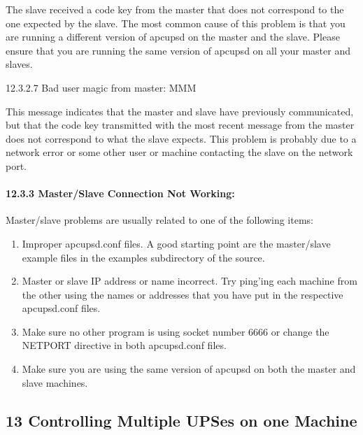 The slave received a code key from the master that does not correspond to the
one expected by the slave. The most common cause of this problem is that you
are running a different version of apcupsd on the master and the slave. Please
ensure that you are running the same version of apcupsd on all your master and
slaves. 

\label{Bad-user-magic-from-master_003b-MMM}

{\small12.3.2.7 Bad user magic from master: MMM}

This message indicates that the master and slave have previously communicated,
but that the code key transmitted with the most recent message from the master
does not correspond to what the slave expects. This problem is probably due to
a network error or some other user or machine contacting the slave on the
network port. 

\label{Master_002fSlave-Connection-Not-Working}

\paragraph*{12.3.3 Master/Slave Connection Not Working:}

Master/slave problems are usually related to one of the following items:  

\begin{enumerate}
\item Improper apcupsd.conf files. A good starting point are the master/slave
example files in the examples subdirectory of the source.  
\item Master or slave IP address or name incorrect. Try ping'ing each machine
from the other using the names or addresses that you have put in the
respective apcupsd.conf files.  
\item Make sure no other program is using socket number 6666 or change the
NETPORT directive in both apcupsd.conf files.  
\item Make sure you are using the same version of apcupsd on both the master
and slave machines.  
\end{enumerate}

\label{Controlling-Multiple-UPSes-on-one-Machine}

\subsection*{13 Controlling Multiple UPSes on one Machine}

